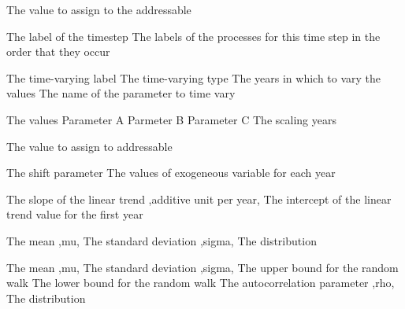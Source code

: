  {The value to assign to the addressable}
\par\par
{} {The label of the timestep}
 {The labels of the processes for this time step in the order that they occur}
\par\par
{} {The time-varying label}
 {The time-varying type}
 {The years in which to vary the values}
 {The name of the parameter to time vary}
\par\textbf{}\par
{} {The values}
 {Parameter A}
 {Parmeter B}
 {Parameter C}
 {The scaling years}
\par\textbf{}\par
{} {The value to assign to addressable}
\par\textbf{}\par
{} {The shift parameter}
 {The values of exogeneous variable for each year}
\par\textbf{}\par
{} {The slope of the linear trend ,additive unit per year,}
 {The intercept of the linear trend value for the first year}
\par\textbf{}\par
{} {The mean ,mu,}
 {The standard deviation ,sigma,}
 {The distribution}
\par\textbf{}\par
{} {The mean ,mu,}
 {The standard deviation ,sigma,}
 {The upper bound for the random walk}
 {The lower bound for the random walk}
 {The autocorrelation parameter ,rho,}
 {The distribution}
